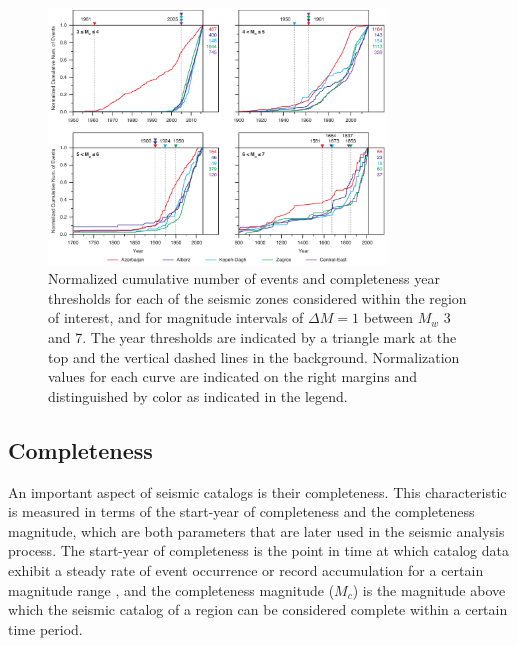 
\begin{figure}[t]
    \centering
    \includegraphics[width=0.8\textwidth]{figures/pdf/figure-05.pdf} 
    \caption{Normalized cumulative number of events and completeness year thresholds for each of the seismic zones considered within the region of interest, and for magnitude intervals of $\Delta M = 1$ between $M_w$ 3 and 7. The year thresholds are indicated by a triangle mark at the top and the vertical dashed lines in the background. Normalization values for each curve are indicated on the right margins and distinguished by color as indicated in the legend.}
    \label{fig:completeness}
\end{figure}

\subsection{Completeness}

An important aspect of seismic catalogs is their completeness. This characteristic is measured in terms of the start-year of completeness and the completeness magnitude, which are both parameters that are later used in the seismic analysis process. The start-year of completeness is the point in time at which catalog data exhibit a steady rate of event occurrence or record accumulation for a certain magnitude range , and the completeness magnitude ($M_c$) is the magnitude above which the seismic catalog of a region can be considered complete within a certain time period. 

